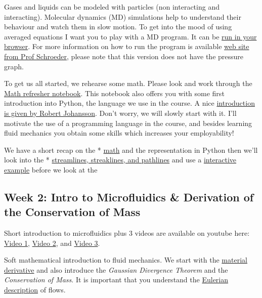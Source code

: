 \documentclass[11pt]{article}
\begin{document}
Gases and liquids can be modeled with particles (non interacting and
interacting). Molecular dynamics (MD) simulations help to understand
their behaviour and watch them in slow motion. To get into the mood of
using averaged equations I want you to play with a MD program. It can be
\href{http://cav2012.sg/cdohl/ph3501/md/}{run in your browser}. For more
information on how to run the program is available
\href{http://physics.weber.edu/schroeder/md/}{web site from Prof
Schroeder}, please note that this version does not have the pressure
graph.

To get us all started, we rehearse some math. Please look and work
through the
\href{01\%20Math\%20Refresher\%20and\%20Python\%20Introduction.ipynb}{Math
refresher notebook}. This notebook also offers you with some first
introduction into Python, the language we use in the course. A nice
\href{http://nbviewer.jupyter.org/github/jrjohansson/scientific-python-lectures/blob/master/Lecture-1-Introduction-to-Python-Programming.ipynb}{introduction
is given by Robert Johansson}. Don't worry, we will slowly start with
it. I'll motivate the use of a programming language in the course, and
besides learning fluid mechanics you obtain some skills which increases
your employability!

We have a short recap on the *
\href{01\%20Math\%20Refresher\%20and\%20Python\%20Introduction.ipynb}{math}
and the representation in Python then we'll look into the *
\href{02\%20Streamlines,\%20Pathlines,\%20Streaklines.ipynb}{streamlines,
streaklines, and pathlines} and use a
\href{Example\%20of\%20Stream-Streak-Pathlines.ipynb}{interactive
example} before we look at the

\subsection{Week 2: Intro to Microfluidics \& Derivation of the
Conservation of
Mass}\label{week-2-intro-to-microfluidics-derivation-of-the-conservation-of-mass-1}

Short introduction to microfluidics plus 3 videos are available on
youtube here: \href{https://www.youtube.com/watch?v=b8zE2i755-k}{Video
1}, \href{https://www.youtube.com/watch?v=68p3qAm4i7U}{Video 2}, and
\href{https://www.youtube.com/watch?v=EYuyRUjnTgc}{Video 3}.

Soft mathematical introduction to fluid mechanics. We start with the
\href{Material\%20Derivative,\%20Gaussian\%20Divergence\%20Theorem\%20and\%20Conservation\%20of\%20Mass.ipynb}{material
derivative} and also introduce the \emph{Gaussian Divergence Theorem}
and the \emph{Conservation of Mass}. It is important that you understand
the
\href{https://en.wikipedia.org/wiki/Lagrangian_and_Eulerian_specification_of_the_flow_field}{Eulerian
description} of flows.
\end{document}
